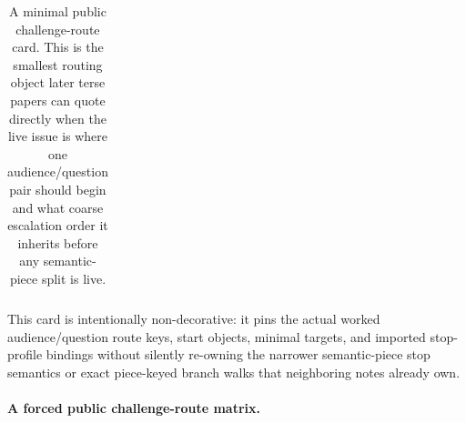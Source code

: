 \documentclass[11pt]{article}
\begin{document}
\begin{table}[t]
\begin{tabularx}{\linewidth}{@{}lX@{}}
\bottomrule
\end{tabularx}
\caption{A minimal public challenge-route card. This is the smallest routing object later terse papers can quote directly when the live issue is where one audience/question pair should begin and what coarse escalation order it inherits before any semantic-piece split is live.}
\label{tab:minimal-public-challenge-route-card}
\end{table}

This card is intentionally non-decorative: it pins the actual worked audience/question route keys, start objects, minimal targets, and imported stop-profile bindings without silently re-owning the narrower semantic-piece stop semantics or exact piece-keyed branch walks that neighboring notes already own.\cite{series:workedexample}

\paragraph{A forced public challenge-route matrix.}
\end{document}
